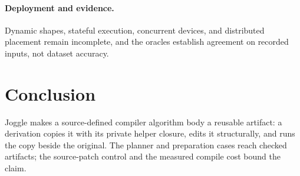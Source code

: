 \documentclass[sigplan,anonymous,review]{acmart}
\begin{document}
\paragraph{Deployment and evidence.}
Dynamic shapes, stateful execution, concurrent devices, and distributed
placement remain incomplete, and the oracles establish agreement on recorded
inputs, not dataset accuracy.

\section{Conclusion}
Joggle makes a source-defined compiler algorithm body a reusable artifact: a
derivation copies it with its private helper closure, edits it structurally, and
runs the copy beside the original. The planner and preparation cases reach
checked artifacts; the source-patch control and the measured compile cost bound
the claim.



\end{document}
